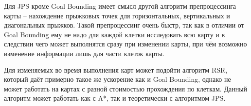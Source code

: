 Для JPS кроме Goal Bounding имеет смысл другой алгоритм препроцессинга карты -- нахождение прыжковых точек для горизонтальных, вертикальных и диагональных прыжков. Такой препроцессинг очень быстр, так как в отличии от Goal Bounding ему не надо для каждой клетки исследовать всю карту и в следствии чего может выполнятся сразу при изменении карты, при чём возможно изменение информации лишь для части клеток карты.

Для изменяемых во время выполнения карт может подойти алгоритм RSR, который даёт примерно такое же ускорение как и Goal Bounding, однако не может работать на картах с разной стоимостью прохождения по клеткам. Данный алгоритм может работать как с A*, так и теоретически с алгоритмом JPS.